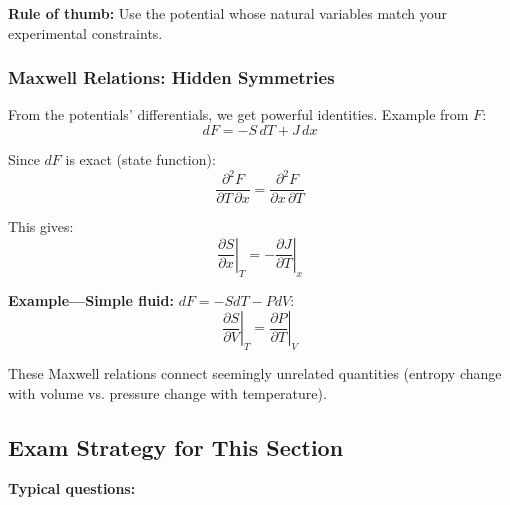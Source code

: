 \documentclass[9pt,twocoloumn]{article}
\begin{document}
\textbf{Rule of thumb:} Use the potential whose natural variables match your experimental constraints.

\subsubsection{Maxwell Relations: Hidden Symmetries}

From the potentials' differentials, we get powerful identities. Example from $F$:
\begin{equation}
dF = -S \, dT + J \, dx
\end{equation}

Since $dF$ is exact (state function):
\begin{equation}
\frac{\partial^2 F}{\partial T \, \partial x} = \frac{\partial^2 F}{\partial x \, \partial T}
\end{equation}

This gives:
\begin{equation}
\boxed{\left. \frac{\partial S}{\partial x} \right|_T = -\left. \frac{\partial J}{\partial T} \right|_x}
\end{equation}

\textbf{Example—Simple fluid:} $dF = -S dT - P dV$:
\begin{equation}
\left. \frac{\partial S}{\partial V} \right|_T = \left. \frac{\partial P}{\partial T} \right|_V
\end{equation}

These Maxwell relations connect seemingly unrelated quantities (entropy change with volume vs. pressure change with temperature).

\subsection{Exam Strategy for This Section}

\textbf{Typical questions:}
\end{document}
